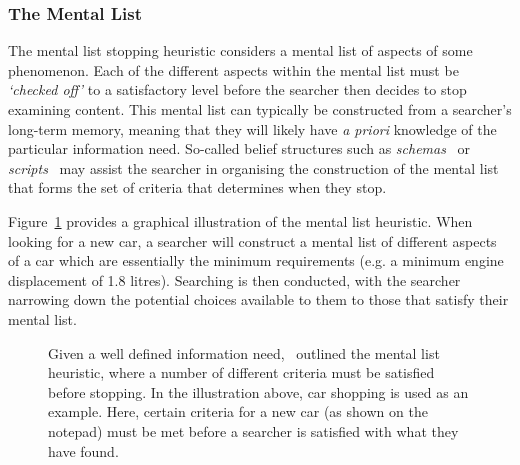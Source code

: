 \subsubsection{The Mental List}\label{sec:stopping_background:heuristics:mental}
The mental list stopping heuristic considers a mental list of aspects of some phenomenon. Each of the different aspects within the mental list must be \emph{`checked off'} to a satisfactory level before the searcher then decides to stop examining content. This mental list can typically be constructed from a searcher's long-term memory, meaning that they will likely have \emph{a priori} knowledge of the particular information need. So-called belief structures such as \emph{schemas}~\citep{bartlett1933remembering} or \emph{scripts}~\citep{schank1977scripts} may assist the searcher in organising the construction of the mental list that forms the set of criteria that determines when they stop.

Figure~\ref{fig:mental_list} provides a graphical illustration of the mental list heuristic. When looking for a new car, a searcher will construct a mental list of different aspects of a car which are essentially the minimum requirements (e.g. a minimum engine displacement of 1.8 litres). Searching is then conducted, with the searcher narrowing down the potential choices available to them to those that satisfy their mental list.

\begin{figure}[t!]
    \centering
    \caption[The mental list stopping heuristic]{Given a well defined information need,~\cite{nickles1995judgment} outlined the mental list heuristic, where a number of different criteria must be satisfied before stopping. In the illustration above, car shopping is used as an example. Here, certain criteria for a new car (as shown on the notepad) must be met before a searcher is satisfied with what they have found.}
    \label{fig:mental_list}
\end{figure}

